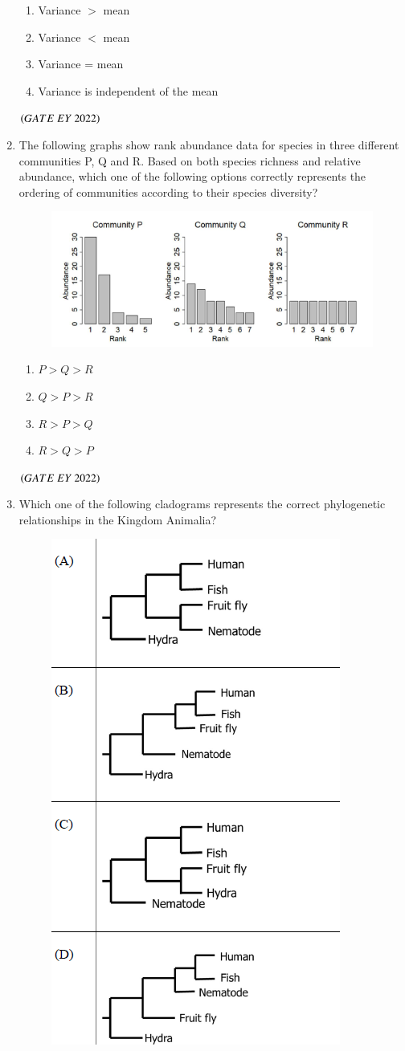 \documentclass[journal]{IEEEtran}
\numberwithin{equation}{enumi}
\numberwithin{figure}{enumi}
\begin{document}
\begin{enumerate}
    \begin{enumerate}
        \item  Variance $>$ mean
        \item  Variance $<$ mean
        \item  Variance = mean
        \item  Variance is independent of the mean
    \end{enumerate}
    \hfill{$\brak{ GATE\ EY\ 2022}$}
    \bigskip
 \item The following graphs show rank abundance data for species in three different
communities P, Q and R. Based on both species richness and relative abundance,
which one of the following options correctly represents the ordering of communities
according to their species diversity?
\begin{figure}[H]
    \centering
\includegraphics[width=0.5\columnwidth]{figs/13.png}
    \caption{}
    \label{fig:13}
   \end{figure}
    \begin{enumerate}
        \item  $P > Q > R$
        \item  $Q > P > R$
        \item  $R > P > Q$
        \item  $R > Q > P$
    \end{enumerate}
    \hfill{$\brak{ GATE\ EY\ 2022}$}
    \bigskip
 \item Which one of the following cladograms represents the correct phylogenetic
relationships in the Kingdom Animalia?
\begin{figure}[H]
    \centering
\includegraphics[width=0.5\columnwidth]{figs/14.png}

\end{figure}
\end{enumerate}
\end{document}
